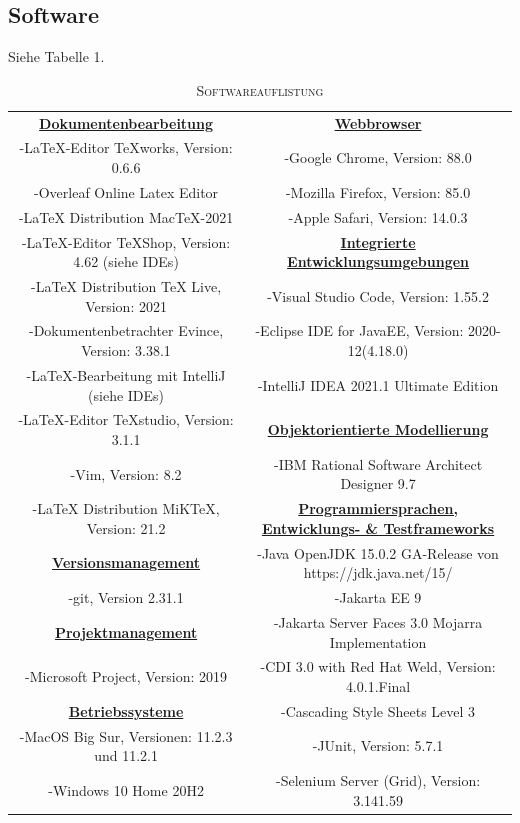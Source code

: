 \documentclass{article}
\begin{document}
\subsection{Software}
Siehe Tabelle 1.
\begin{center}
\begin{table}
\caption{\textsc{Softwareauflistung}}
\begin{adjustwidth}{-1.5cm}{-1cm}
\begin{tabular} { c c }
\underline{\textbf{Dokumentenbearbeitung}} & \underline{\textbf{Webbrowser}} \\
-LaTeX-Editor TeXworks, Version: 0.6.6 &-Google Chrome, Version: 88.0 \\
-Overleaf Online Latex Editor &-Mozilla Firefox, Version: 85.0 \\
-LaTeX Distribution MacTeX-2021 &-Apple Safari, Version: 14.0.3 \\
-LaTeX-Editor TeXShop, Version: 4.62 (siehe IDEs) & \underline{\textbf{Integrierte Entwicklungsumgebungen}} \\
-LaTeX Distribution TeX Live, Version: 2021 &-Visual Studio Code, Version: 1.55.2 \\
-Dokumentenbetrachter Evince, Version: 3.38.1 &-Eclipse IDE for JavaEE, Version: 2020-12(4.18.0) \\
-LaTeX-Bearbeitung mit IntelliJ (siehe IDEs) &-IntelliJ IDEA 2021.1 Ultimate Edition \\
-LaTeX-Editor TeXstudio, Version: 3.1.1 & \underline{\textbf{Objektorientierte Modellierung}}\\
-Vim, Version: 8.2 &-IBM Rational Software Architect Designer 9.7 \\
-LaTeX Distribution MiKTeX, Version: 21.2 & \underline{\textbf{Programmiersprachen, Entwicklungs- \& Testframeworks}}\\
\underline{\textbf{Versionsmanagement}} &-Java OpenJDK 15.0.2 GA-Release von https://jdk.java.net/15/ \\
-git, Version 2.31.1 &-Jakarta EE 9\\
\underline{\textbf{Projektmanagement}} &-Jakarta Server Faces 3.0 Mojarra Implementation\\
-Microsoft Project, Version: 2019 &-CDI 3.0 with Red Hat Weld, Version: 4.0.1.Final\\
\underline{\textbf{Betriebssysteme}} &-Cascading Style Sheets Level 3\\
-MacOS Big Sur, Versionen: 11.2.3 und 11.2.1 &-JUnit, Version: 5.7.1 \\
-Windows 10 Home 20H2 &-Selenium Server (Grid), Version: 3.141.59\\

\end{tabular}
\end{adjustwidth}
\end{table}
\end{center}
\end{document}
